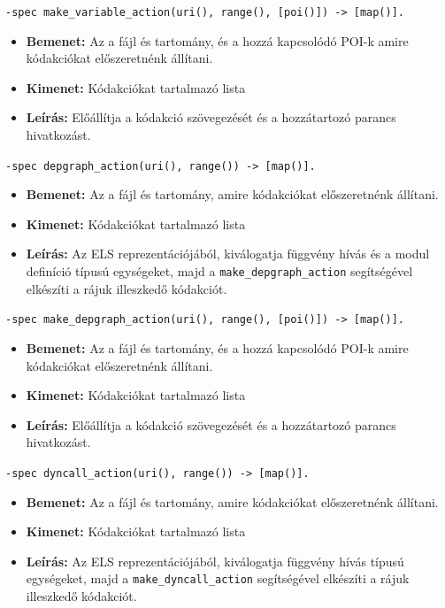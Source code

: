     
    
\noindent \lstinline{-spec make_variable_action(uri(), range(), [poi()]) -> [map()].}
    \begin{itemize}
        \item \textbf{Bemenet:} Az a fájl és tartomány, és a hozzá kapcsolódó POI-k amire kódakciókat előszeretnénk állítani.
        \item \textbf{Kimenet:} Kódakciókat tartalmazó lista
        \item \textbf{Leírás:} Előállítja a kódakció szövegezését és a hozzátartozó parancs hivatkozást.
    \end{itemize}
    
    
    
\noindent  \lstinline{-spec depgraph_action(uri(), range()) -> [map()].}
    \begin{itemize}
        \item \textbf{Bemenet:} Az a fájl és tartomány, amire kódakciókat előszeretnénk állítani.
        \item \textbf{Kimenet:} Kódakciókat tartalmazó lista
        \item \textbf{Leírás:} Az ELS reprezentációjából, kiválogatja függvény hívás és a modul definíció típusú egységeket, majd a \lstinline{make_depgraph_action} segítségével elkészíti a rájuk illeszkedő kódakciót.
    \end{itemize}
    
    
    
\noindent  \lstinline{-spec make_depgraph_action(uri(), range(), [poi()]) -> [map()].}
    \begin{itemize}
        \item \textbf{Bemenet:} Az a fájl és tartomány, és a hozzá kapcsolódó POI-k amire kódakciókat előszeretnénk állítani.
        \item \textbf{Kimenet:} Kódakciókat tartalmazó lista
        \item \textbf{Leírás:} Előállítja a kódakció szövegezését és a hozzátartozó parancs hivatkozást.
    \end{itemize}
    
    
    
\noindent \lstinline{-spec dyncall_action(uri(), range()) -> [map()].}
    \begin{itemize}
        \item \textbf{Bemenet:} Az a fájl és tartomány, amire kódakciókat előszeretnénk állítani.
        \item \textbf{Kimenet:} Kódakciókat tartalmazó lista
        \item \textbf{Leírás:} Az ELS reprezentációjából, kiválogatja függvény hívás típusú egységeket, majd a \lstinline{make_dyncall_action} segítségével elkészíti a rájuk illeszkedő kódakciót.
    \end{itemize}
    
